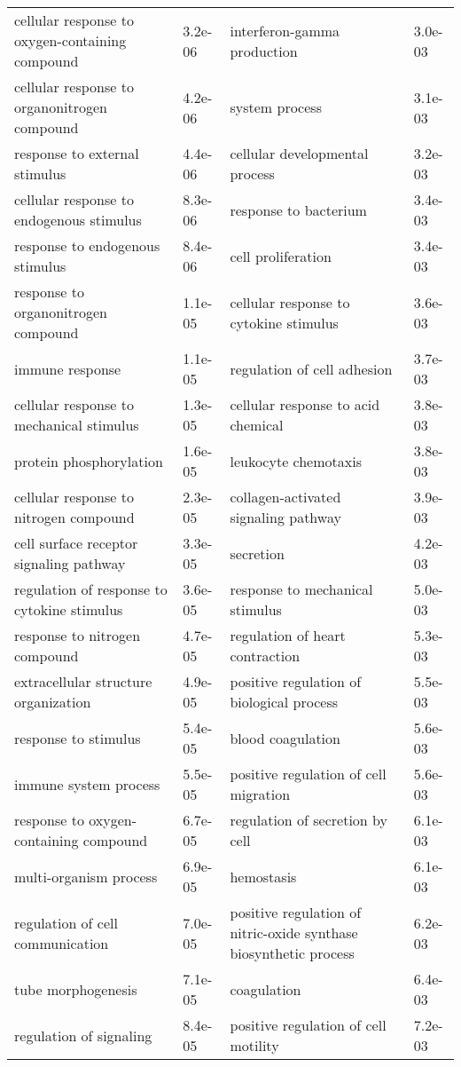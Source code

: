 \documentclass[fleqn,10pt]{SelfArx} %
\begin{document}
\begin{table}[ht]
\begin{tabularx}{\textwidth}{XlXl}
		cellular response to oxygen-containing compound & 3.2e-06 & interferon-gamma production & 3.0e-03 \\ 
		cellular response to organonitrogen compound & 4.2e-06 & system process & 3.1e-03 \\ 
		response to external stimulus & 4.4e-06 & cellular developmental process & 3.2e-03 \\ 
		cellular response to endogenous stimulus & 8.3e-06 & response to bacterium & 3.4e-03 \\ 
		response to endogenous stimulus & 8.4e-06 & cell proliferation & 3.4e-03 \\ 
		response to organonitrogen compound & 1.1e-05 & cellular response to cytokine stimulus & 3.6e-03 \\ 
		immune response & 1.1e-05 & regulation of cell adhesion & 3.7e-03 \\ 
		cellular response to mechanical stimulus & 1.3e-05 & cellular response to acid chemical & 3.8e-03 \\ 
		protein phosphorylation & 1.6e-05 & leukocyte chemotaxis & 3.8e-03 \\ 
		cellular response to nitrogen compound & 2.3e-05 & collagen-activated signaling pathway & 3.9e-03 \\ 
		cell surface receptor signaling pathway & 3.3e-05 & secretion & 4.2e-03 \\ 
		regulation of response to cytokine stimulus & 3.6e-05 & response to mechanical stimulus & 5.0e-03 \\ 
		response to nitrogen compound & 4.7e-05 & regulation of heart contraction & 5.3e-03 \\ 
		extracellular structure organization & 4.9e-05 & positive regulation of biological process & 5.5e-03 \\ 
		response to stimulus & 5.4e-05 & blood coagulation & 5.6e-03 \\ 
		immune system process & 5.5e-05 & positive regulation of cell migration & 5.6e-03 \\ 
		response to oxygen-containing compound & 6.7e-05 & regulation of secretion by cell & 6.1e-03 \\ 
		multi-organism process & 6.9e-05 & hemostasis & 6.1e-03 \\ 
		regulation of cell communication & 7.0e-05 & positive regulation of nitric-oxide synthase biosynthetic process & 6.2e-03 \\ 
		tube morphogenesis & 7.1e-05 & coagulation & 6.4e-03 \\ 
		regulation of signaling & 8.4e-05 & positive regulation of cell motility & 7.2e-03 \\ 

\end{tabularx}
\end{table}
\end{document}
